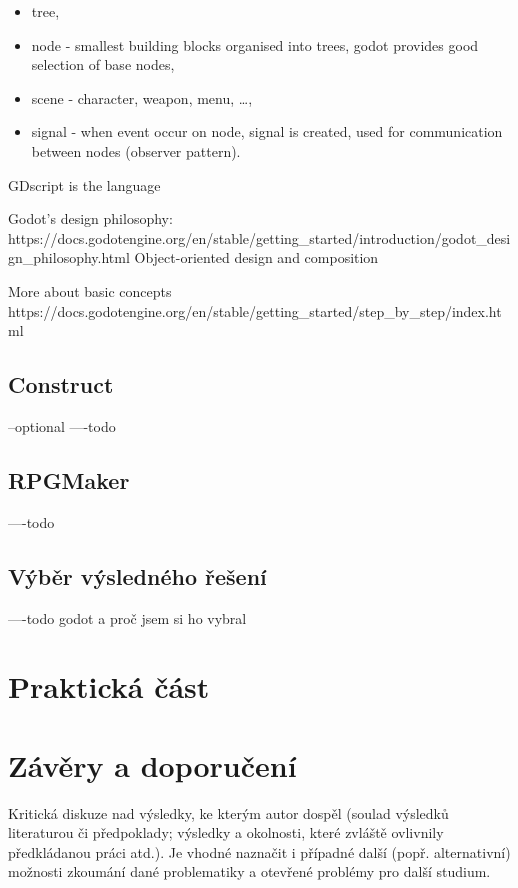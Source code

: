 \begin{itemize}
	\item tree,
	\item node - smallest building blocks organised into trees, godot provides good selection of base nodes,
	\item scene - character, weapon, menu, \ldots,
	\item  signal - when event occur on node, signal is created, used for communication between nodes (observer pattern).
\end{itemize}

GDscript is the language

Godot's design philosophy:
https://docs.godotengine.org/en/stable/getting\_started/introduction/godot\_design\_philosophy.html
Object-oriented design and composition

More about basic concepts
https://docs.godotengine.org/en/stable/getting\_started/step\_by\_step/index.html

\subsection{Construct}
--optional
----todo \linebreak

\subsection{RPGMaker}
----todo \linebreak

\subsection{Výběr výsledného řešení}
----todo \linebreak godot a proč jsem si ho vybral


\section{Praktická část}



\section{Závěry a doporučení}


Kritická diskuze nad výsledky, ke kterým autor dospěl (soulad výsledků  literaturou či předpoklady;
výsledky a okolnosti, které zvláště ovlivnily předkládanou práci atd.). Je vhodné naznačit i případné další
(popř. alternativní) možnosti zkoumání dané problematiky a otevřené problémy pro další studium.

